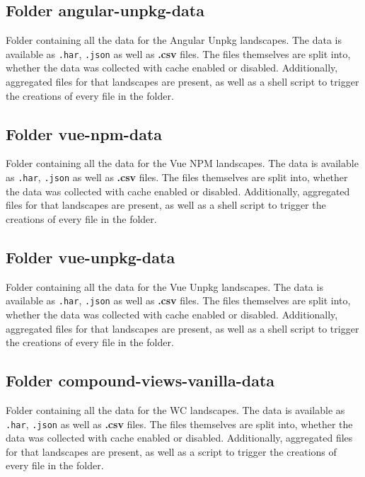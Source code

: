 \subsection{Folder angular-unpkg-data}

Folder containing all the data for the Angular Unpkg landscapes. 
The data is available as \texttt{.har}, \texttt{.json} as well as \textbf{.csv} files. 
The files themselves are split into, whether the data was collected with cache enabled or disabled.
Additionally, aggregated files for that landscapes are present, as well as a shell script to trigger the creations of every file in the folder.

\subsection{Folder vue-npm-data}

Folder containing all the data for the Vue NPM landscapes. 
The data is available as \texttt{.har}, \texttt{.json} as well as \textbf{.csv} files. 
The files themselves are split into, whether the data was collected with cache enabled or disabled.
Additionally, aggregated files for that landscapes are present, as well as a shell script to trigger the creations of every file in the folder.

\subsection{Folder vue-unpkg-data}

Folder containing all the data for the Vue Unpkg landscapes. 
The data is available as \texttt{.har}, \texttt{.json} as well as \textbf{.csv} files. 
The files themselves are split into, whether the data was collected with cache enabled or disabled.
Additionally, aggregated files for that landscapes are present, as well as a shell script to trigger the creations of every file in the folder.

\subsection{Folder compound-views-vanilla-data}

Folder containing all the data for the WC landscapes. 
The data is available as \texttt{.har}, \texttt{.json} as well as \textbf{.csv} files. 
The files themselves are split into, whether the data was collected with cache enabled or disabled.
Additionally, aggregated files for that landscapes are present, as well as a script to trigger the creations of every file in the folder.

